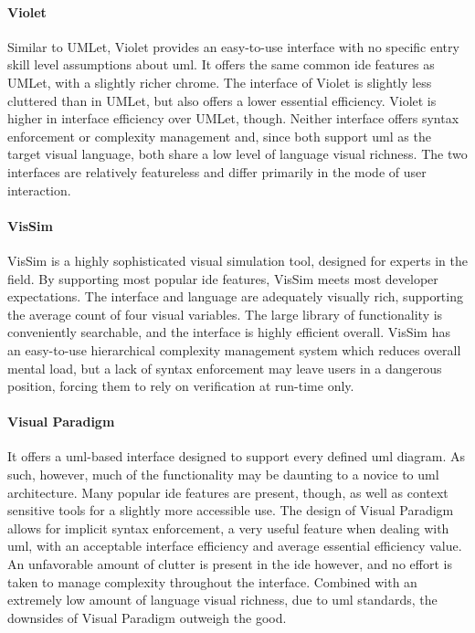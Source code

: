 \paragraph{Violet} Similar to UMLet, Violet provides an easy-to-use
interface with no specific entry skill level assumptions about \ac{uml}. It offers the
same common \ac{ide} features as UMLet, with a slightly richer chrome.
The interface of Violet is slightly less cluttered than in UMLet, but also offers
a lower essential efficiency. Violet is higher in interface efficiency over
UMLet, though. Neither interface offers syntax enforcement or complexity
management and, since both support \ac{uml} as the target visual language,
both share a low level of language visual richness. The two interfaces are
relatively featureless and differ primarily in the mode of user
interaction.

\paragraph{VisSim} VisSim is a highly sophisticated visual simulation tool,
designed for experts in the field. By supporting most popular \ac{ide}
features, VisSim meets most developer expectations. The interface and
language are adequately visually rich, supporting the average count of four
visual variables. The large library of functionality is conveniently
searchable, and the interface is highly efficient overall. VisSim has an easy-to-use
hierarchical complexity management system which reduces overall mental
load, but a lack of syntax enforcement may leave users in a dangerous
position, forcing them to rely on verification at run-time only.

\paragraph{Visual Paradigm} It offers a \ac{uml}-based
interface designed to support every defined \ac{uml} diagram. As such,
however, much of the functionality may be daunting to a novice to \ac{uml}
architecture. Many popular \ac{ide} features are present, though, as well
as context sensitive tools for a slightly more accessible use. The design of Visual
Paradigm allows for implicit syntax enforcement, a very useful
feature when dealing with \ac{uml}, with an acceptable interface
efficiency and average essential efficiency value. An unfavorable amount of
clutter is present in the \ac{ide} however, and no effort is taken to
manage complexity throughout the interface. Combined with an extremely low
amount of language visual richness, due to \ac{uml} standards, the downsides
of Visual Paradigm outweigh the good.

